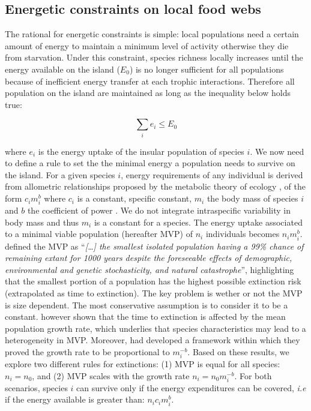 \subsection{Energetic constraints on local food
webs}\label{energetic-constraints-on-local-food-webs}

The rational for energetic constraints is simple: local populations need
a certain amount of energy to maintain a minimum level of activity
otherwise they die from starvation. Under this constraint, species
richness locally increases until the energy available on the island
(\(E_0\)) is no longer sufficient for all populations because of
inefficient energy transfer at each trophic interactions. Therefore all
population on the island are maintained as long as the inequality below
holds true:

\begin{equation} \sum_i e_i \leq E_0\label{eq:chp4id0}\end{equation}

where \(e_i\) is the energy uptake of the insular population of species
\(i\). We now need to define a rule to set the the minimal energy a
population needs to survive on the island. For a given species \(i\),
energy requirements of any individual is derived from allometric
relationships proposed by the metabolic theory of ecology
\citep{Brown2004}, of the form \(c_im_i^b\) where \(c_i\) is a constant,
specific constant, \(m_i\) the body mass of species \(i\) and \(b\) the
coefficient of power \citep[between 2/3 and 3/4][]{White2013}. We do not
integrate intraspecific variability in body mass and thus \(m_i\) is a
constant for a species. The energy uptake associated to a minimal viable
population (hereafter MVP) of \(n_i\) individuals becomes \(n_im_i^b\).
\citet{Shaffer1981} defined the MVP as ``\emph{{[}\ldots{}{]} the
smallest isolated population having a 99\% chance of remaining extant
for 1000 years despite the foreseeable effects of demographic,
environmental and genetic stochasticity, and natural catastrophe}'',
highlighting that the smallest portion of a population has the highest
possible extinction risk (extrapolated as time to extinction). The key
problem is wether or not the MVP is size dependent. The most
conservative assumption is to consider it to be a constant.
\citet{Lande1993} however shown that the time to extinction is affected
by the mean population growth rate, which underlies that species
characteristics may lead to a heterogeneity in MVP. Moreover,
\citet{Savage2004} had developed a framework within which they proved
the growth rate to be proportional to \(m_i^{-b}\). Based on these
results, we explore two different rules for extinctions: (1) MVP is
equal for all species: \(n_i=n_0\), and (2) MVP scales with the growth
rate \(n_i=n_0m_i^{-b}\). For both scenarios, species \(i\) can survive
only if the energy expenditures can be covered, \emph{i.e} if the energy
available is greater than: \(n_ic_im_i^b\).

